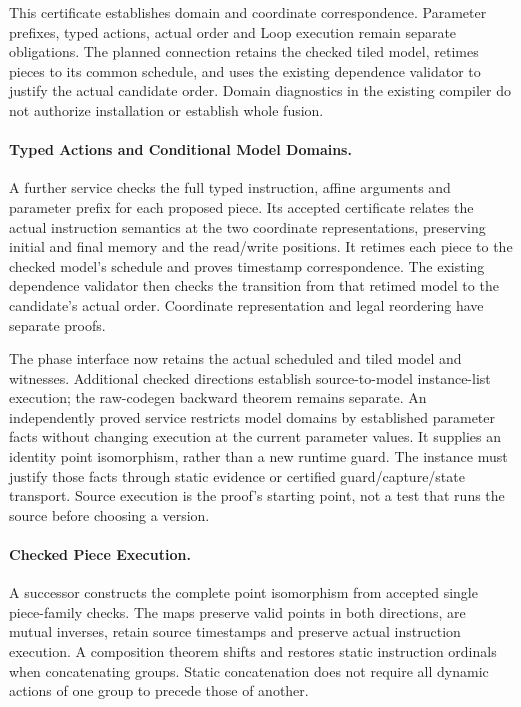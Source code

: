 This certificate establishes domain and coordinate correspondence. Parameter
prefixes, typed actions, actual order and Loop execution remain separate
obligations. The planned connection retains the checked tiled model, retimes
pieces to its common schedule, and uses the existing dependence validator to
justify the actual candidate order. Domain diagnostics in the existing compiler
do not authorize installation or establish whole fusion.

\paragraph{Typed Actions and Conditional Model Domains.}
A further service checks the full typed instruction, affine arguments and
parameter prefix for each proposed piece. Its accepted certificate relates
the actual instruction semantics at the two coordinate representations,
preserving initial and final memory and the read/write positions. It retimes
each piece to the checked model's schedule and proves timestamp correspondence.
The existing dependence validator then checks the transition from that retimed
model to the candidate's actual order. Coordinate representation and legal
reordering have separate proofs.

The phase interface now retains the actual scheduled and tiled model and
witnesses. Additional checked directions establish source-to-model
instance-list execution; the raw-codegen backward theorem remains separate.
An independently proved service restricts model domains by established
parameter facts without changing execution at the current parameter values.
It supplies an identity point isomorphism, rather than a new runtime guard.
The instance must justify those facts through static evidence or certified
guard/capture/state transport. Source execution is the proof's starting point,
not a test that runs the source before choosing a version.

\paragraph{Checked Piece Execution.}
A successor constructs the complete point isomorphism from accepted single
piece-family checks. The maps preserve valid points in both directions, are
mutual inverses, retain source timestamps and preserve actual instruction
execution. A composition theorem shifts and restores static instruction
ordinals when concatenating groups. Static concatenation does not require all
dynamic actions of one group to precede those of another.

